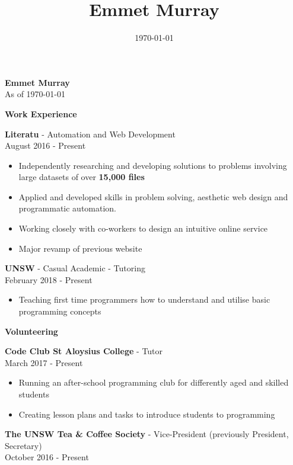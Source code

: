 \documentclass{article}
\title{\textbf{Emmet Murray}}
\date{\today}
\newcommand{\minititle}[1]{{\Large \begin{center} \textbf{#1} \end{center}} \vspace{0.2cm}}
\newcommand{\resumeEntry}[3]{{\large \textbf{#1} - #2} \\ \small{#3} }
\begin{document}
 
%
\begin{minipage}[t]{0.6\linewidth}   
    \begin{center}
        { \huge \textbf{Emmet Murray}} \\
        \vspace{0.4cm}
        As of \today
    \end{center}
    {
        \minititle{Work Experience}
        \resumeEntry{Literatu}{Automation and Web Development}{August 2016 - Present}
        \begin{itemize}
            \setlength\itemsep{0.03cm}
            \item Independently researching and developing solutions to problems involving large datasets of over \textbf{15,000 files}
            \item Applied and developed skills in problem solving, aesthetic web design and programmatic automation.
            \item Working closely with co-workers to design an intuitive online service
            \item Major revamp of previous website
        \end{itemize}
        \vspace{0.3cm}
        \resumeEntry{UNSW}{Casual Academic - Tutoring}{February 2018 - Present}
        \begin{itemize}
            \setlength\itemsep{0.03cm}
            \item Teaching first time programmers how to understand and utilise basic programming concepts
        \end{itemize}
    }
    {
        \vspace{0.05cm}
        \minititle{Volunteering}
        \resumeEntry{Code Club St Aloysius College}{Tutor}{March 2017 - Present}
        \begin{itemize}
            \setlength\itemsep{0.03cm}
            \item Running an after-school programming club for differently aged and skilled students
            \item Creating lesson plans and tasks to introduce students to programming
        \end{itemize}
        \vspace{0.4cm}
        \resumeEntry{The UNSW Tea \& Coffee Society}{Vice-President (previously President, Secretary)}{October 2016 - Present}
        \begin{itemize}

\end{itemize}}
\end{minipage}
\end{document}

